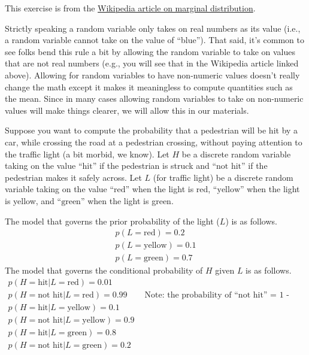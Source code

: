 \documentclass[assignment02_Solutions]{subfiles}
\begin{document}
\begin{exercise}[(15 minutes)]
This exercise is from the \href{https://en.wikipedia.org/wiki/Marginal_distribution\#Real-world_example}{Wikipedia article on marginal distribution}.

\vspace{1em}

\begin{notice}
Strictly speaking a random variable only takes on real numbers as its value (i.e., a random variable cannot take on the value of ``blue'').  That said, it's common to see folks bend this rule a bit by allowing the random variable to take on values that are not real numbers (e.g., you will see that in the Wikipedia article linked above).  Allowing for random variables to have non-numeric values doesn't really change the math except it makes it meaningless to compute quantities such as the mean.  Since in many cases allowing random variables to take on non-numeric values will make things clearer, we will allow this in our materials.
\end{notice} 
\vspace{1em}

Suppose you want to compute the probability that a pedestrian will be hit by a car, while crossing the road at a pedestrian crossing, without paying attention to the traffic light (a bit morbid, we know).  Let $H$ be a discrete random variable taking on the value ``$\mbox{hit}$'' if the pedestrian is struck and ``$\mbox{not hit}$'' if the pedestrian makes it safely across.  Let $L$ (for traffic light) be a discrete random variable taking on the value ``$\mbox{red}$'' when the light is red, ``$\mbox{yellow}$'' when the light is yellow, and ``$\mbox{green}$'' when the light is green.

The model that governs the prior probability of the light ($L$) is as follows.
\begin{align}
p(L = \mbox{red}) = 0.2 \nonumber \\
p(L = \mbox{yellow}) = 0.1 \nonumber \\
p(L = \mbox{green}) = 0.7
\end{align}
The model that governs the conditional probability of $H$ given $L$ is as follows.
\begin{align}
p(H = \mbox{hit} | L = \mbox{red}) = 0.01 \nonumber \\
p(H = \mbox{not hit} | L = \mbox{red}) = 0.99 &~~~~\mbox{Note: the probability of ``not hit''  = 1 - probability of hit} \nonumber \\
p(H = \mbox{hit} | L = \mbox{yellow}) = 0.1 \nonumber \\
p(H = \mbox{not hit} | L = \mbox{yellow}) = 0.9 \nonumber \\
p(H = \mbox{hit} | L = \mbox{green}) = 0.8  \nonumber \\
p(H = \mbox{not hit} | L = \mbox{green}) = 0.2 \nonumber
\end{align}


\end{exercise}
\end{document}
